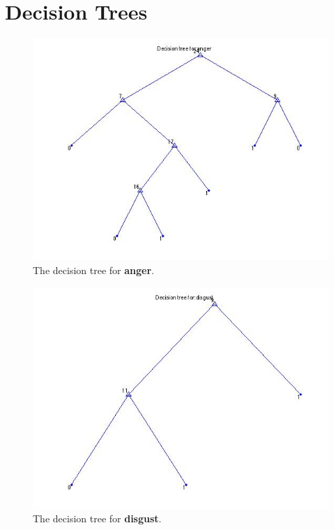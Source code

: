 \documentclass[a4paper,10pt]{article}
\begin{document}
\section*{Decision Trees}
\begin{figure}[h!]
	\centering
    \includegraphics[width=12cm]{anger}
  \caption{The decision tree for \textbf{anger}.}  
\end{figure}

\begin{figure}[h!]
	\centering
    \includegraphics[width=12cm]{disgust}
  \caption{The decision tree for \textbf{disgust}.}  
\end{figure}
\end{document}
